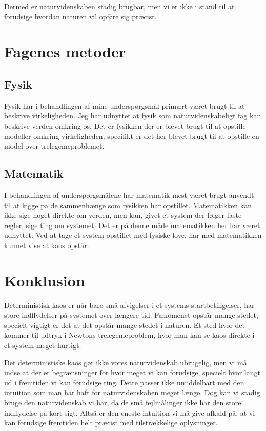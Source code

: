 \documentclass[12pt,a4paper]{article}
\theoremstyle{break}
\theoremstyle{nonumberplain}
\begin{document}
Dermed er naturvidenskaben stadig brugbar, men vi er ikke i stand til at forudsige hvordan naturen vil opføre sig præcist.


\section{Fagenes metoder}
\subsection{Fysik}
Fysik har i behandlingen af mine underspørgsmål primært været brugt til at beskrive virkeligheden. 
Jeg har udnyttet at fysik som naturvidenskabeligt fag kan beskrive verden omkring os.
Det er fysikken der er blevet brugt til at opstille modeller omkring virkeligheden, specifikt er det her blevet brugt til at opstille en model over trelegemeproblemet.

\subsection{Matematik}
I behandlingen af underspørgsmålene har matematik mest været brugt anvendt til at kigge på de sammenhænge som fysikken har opstillet. 
Matematikken kan ikke sige noget direkte om verden, men kan, givet et system der følger faste regler, sige ting om systemet. 
Det er på denne måde matematikken her har været udnyttet. 
Ved at tage et system opstillet med fysiske love, har med matematikken kunnet vise at kaos opstår. 

\section{Konklusion}
Deterministisk kaos er når bare små afvigelser i et systems startbetingelser, har store indflydelser på systemet over længere tid.
Fænomenet opstår mange stedet, specielt vigtigt er det at det opstår mange stedet i naturen. 
Et sted hvor det kommer til udtryk i Newtons trelegemeproblem, hvor man kan se kaos direkte i et system meget hurtigt.

Det deterministiske kaos gør ikke vores naturvidenskab ubrugelig, men vi må indse at der er begrænsninger for hvor meget vi kan forudsige, specielt hvor langt ud i fremtiden vi kan forudsige ting. 
Dette passer ikke umiddelbart med den intuition som man har haft for naturvidenskaben meget længe. 
Dog kan vi stadig bruge den naturvidenskab vi har, da de små fejlmålinger ikke har den store indflydelse på kort sigt. 
Altså er den eneste intuition vi må give afkald på, at vi kan forudsige fremtiden helt præcist med tilstrækkelige oplysninger.
\end{document}

